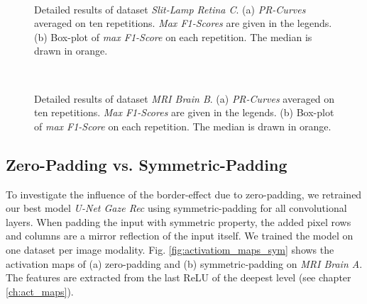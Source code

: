 \begin{figure}[!htbp]
  \centering
  \\[30pt]
  \caption[Detailed results of dataset \textit{Slit-Lamp Retina C}]{Detailed results of dataset \textit{Slit-Lamp Retina C}. (a) \textit{PR-Curves} averaged on ten repetitions. \textit{Max F1-Scores} are given in the legends. (b) Box-plot of \textit{max F1-Score} on each repetition. The median is drawn in orange.}
  \label{fig:curves_ds14}  
\end{figure}

\clearpage
\begin{figure}[!htbp]
  \centering
  \\[20pt]
  \caption[Detailed results of dataset \textit{Slit-Lamp Retina C}]{Detailed results of dataset \textit{MRI Brain B}. (a) \textit{PR-Curves} averaged on ten repetitions. \textit{Max F1-Scores} are given in the legends. (b) Box-plot of \textit{max F1-Score} on each repetition. The median is drawn in orange.}
  \label{fig:curves_ds16}  
\end{figure}

\subsection{Zero-Padding vs. Symmetric-Padding} \label{ch:zero_vs_sym_pad}
To investigate the influence of the border-effect due to zero-padding, we retrained our best model \textit{U-Net Gaze Rec} using symmetric-padding for all convolutional layers. When padding the input with symmetric property, the added pixel rows and columns are a mirror reflection of the input itself. We trained the model on one dataset per image modality. Fig. \ref{fig:activatiom_maps_sym} shows the activation maps of (a) zero-padding and (b) symmetric-padding on \textit{MRI Brain A}. The features are extracted from the last ReLU of the deepest level (see chapter \ref{ch:act_maps}).

